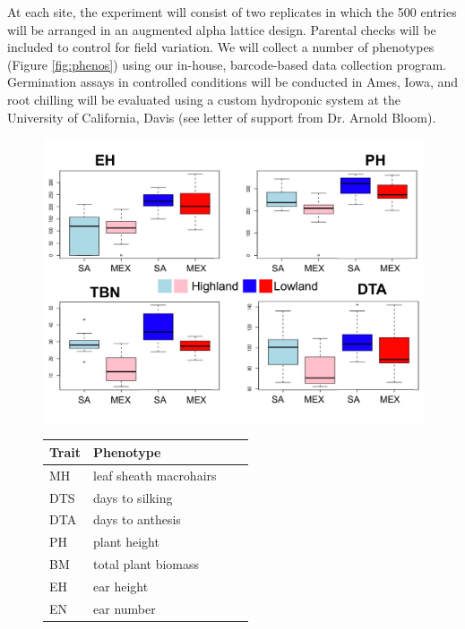 At each site, the experiment will consist of two replicates in which the 500 entries  will be arranged in an augmented alpha lattice design.  Parental checks will be included to control for field variation.  We will collect a  number of phenotypes (Figure \ref{fig:phenos}) using our in-house, barcode-based data collection program. Germination assays  in controlled conditions will be conducted in Ames, Iowa, and root chilling will be evaluated using a custom hydroponic system at the University of California, Davis (see letter of support from Dr. Arnold Bloom).    

\begin{figure}[ht!]
	\begin{minipage}{0.6\textwidth}
    		\centering
   		\includegraphics[width=\textwidth]{fourtraits.pdf}
  	\end{minipage}%
  	\begin{minipage}[c]{0.40\textwidth}
  		\centering
		\begin{tabular}{llcc}\\\toprule  
		{\bf Trait} & {\bf Phenotype}  \\\midrule
		MH & leaf sheath macrohairs  \\
		DTS & days to silking  \\
		DTA & days to anthesis  \\
		PH & plant height 			\\
		BM & total plant biomass 	\\
		EH & ear height			 \\
		EN & ear number			 \\

\end{tabular}
\end{minipage}
\end{figure}
